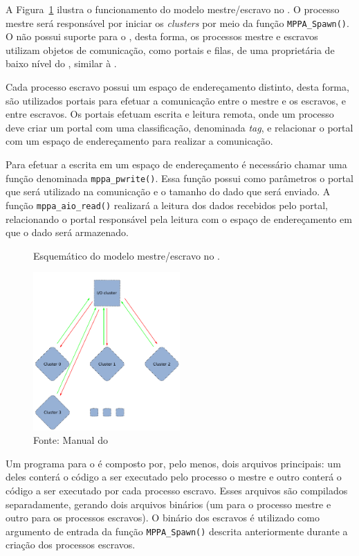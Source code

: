 A Figura~\ref{fig:MPPAIPCTutorial} ilustra o funcionamento do modelo mestre/escravo
no \mppa. O processo mestre será responsável por iniciar os
\textit{clusters} por meio da função \texttt{MPPA\_Spawn()}.
O \mppa não possui suporte para o \mpi, desta forma, os processos mestre e
escravos utilizam objetos de comunicação, como portais e filas, de
uma \api proprietária de baixo nível do \mppa, similar à \posix \ipc.

Cada processo escravo possui um espaço de endereçamento distinto, desta forma,
são utilizados portais para efetuar a comunicação entre o mestre e os escravos, e entre escravos. Os
portais efetuam escrita e leitura remota, onde um processo deve criar um portal
com uma classificação, denominada \textit{tag}, e relacionar o portal com um
espaço de endereçamento para realizar a comunicação.

Para efetuar a escrita em um espaço de endereçamento é necessário chamar uma
função denominada \texttt{mppa\_pwrite()}. Essa função possui como parâmetros o
portal que será utilizado na comunicação e o tamanho do dado que será enviado.
A função \texttt{mppa\_aio\_read()} realizará a leitura dos dados recebidos pelo
portal, relacionando o portal responsável pela leitura com o espaço de
endereçamento em que o dado será armazenado.

\begin{figure}
	\centering
	\caption{Esquemático do modelo mestre/escravo no \mppa.}
	\includegraphics[width=0.5\textwidth]{figs/MPPAIPCTutorial.pdf}
    \caption*{Fonte: Manual do \mppa}
	\label{fig:MPPAIPCTutorial}
\end{figure}

Um programa para o \mppa é composto por, pelo menos, dois arquivos principais:
um deles conterá o código a ser executado pelo processo o mestre e outro conterá o código
a ser executado por cada processo escravo. Esses arquivos são compilados separadamente,
gerando dois arquivos binários (um para o processo mestre e outro para os processos escravos).
O binário dos escravos é utilizado como argumento de entrada da função \texttt{MPPA\_Spawn()}
descrita anteriormente durante a criação dos processos escravos.

